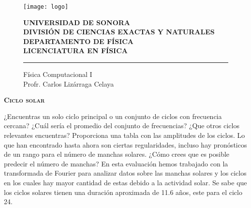 
\date{26 de abril de 2017}


\begin{titlepage}

    \begin{figure}[ht!]
    \centering
    \texttt{[image: logo]}
    
    \textbf{UNIVERSIDAD DE SONORA \\ DIVISIÓN DE CIENCIAS EXACTAS Y NATURALES \\ DEPARTAMENTO DE FÍSICA \\ LICENCIATURA EN FÍSICA}
	\maketitle
    \hrule \bigskip
    \large{Física Computacional I}\\
	Profr. Carlos Lizárraga Celaya
    \end{figure}
\thispagestyle{empty}

\end{titlepage}

\newpage

\begin{center}
\huge{\textbf{\textsc{Ciclo solar}}}
\end{center}
¿Encuentras un solo ciclo principal o un conjunto de ciclos con frecuencia cercana? ¿Cuál sería el promedio del conjunto de frecuencias?
¿Que otros ciclos relevantes encuentras? Proporciona una tabla con las amplitudes de los ciclos. 
Lo que han encontrado hasta ahora son ciertas regularidades, incluso hay pronósticos de un rango para el número de manchas solares. ¿Cómo crees que es posible predecir el número de manchas?
\noindent En esta evaluación hemos trabajado con la transformada de Fourier para analizar datos sobre las manchas solares y los ciclos en los cuales hay mayor cantidad de estas debido a la actividad solar. Se sabe que los ciclos solares tienen una duración aproximada de 11.6 años, este para el ciclo 24.


